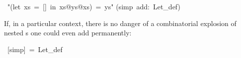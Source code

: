 \begin{isabelle}%
~{"}(let~xs~=~[]~in~xs@ys@xs)~=~ys{"}\isanewline
{}(simp~add:~Let\_def)%
\begin{isamarkuptext}%
If, in a particular context, there is no danger of a combinatorial explosion
of nested s one could even add  permanently:%
\end{isamarkuptext}%
~[simp]~=~Let\_def\end{isabelle}%
